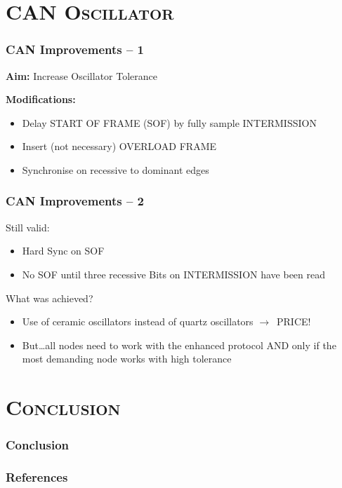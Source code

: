 \documentclass[xcolor=x11names,compress]{beamer}
\renewcommand{\(}{\begin{columns}}
\renewcommand{\)}{\end{columns}}
\newcommand{\<}[1]{\begin{column}{#1}}
\renewcommand{\>}{\end{column}}
\begin{document}
\section{\scshape CAN Oscillator}
\begin{frame}
  \frametitle{CAN Improvements -- 1}

\textbf{Aim:} Increase Oscillator Tolerance
\vspace{0.3cm}

\textbf{Modifications:}
\begin{itemize}
    \item Delay START OF FRAME (SOF) by fully sample INTERMISSION
    \item Insert (not necessary) OVERLOAD FRAME
    \item Synchronise on recessive to dominant edges
\end{itemize}

\end{frame}

\begin{frame}
  \frametitle{CAN Improvements -- 2}
Still valid:
\begin{itemize}
    \item Hard Sync on SOF 
    \item No SOF until three recessive Bits on INTERMISSION have been read
\end{itemize}

What was achieved?
\begin{itemize}
  \item Use of ceramic oscillators instead of quartz oscillators $\rightarrow$~PRICE!
  \item But\ldots all nodes need to work with the enhanced protocol AND only if the most demanding node works with high tolerance
\end{itemize}

\end{frame}

\section{\scshape Conclusion}

\begin{frame}
  \frametitle{Conclusion}
\end{frame}

\begin{frame}
  \frametitle{References}
  \scriptsize
  
  
\end{frame}
\end{document}
